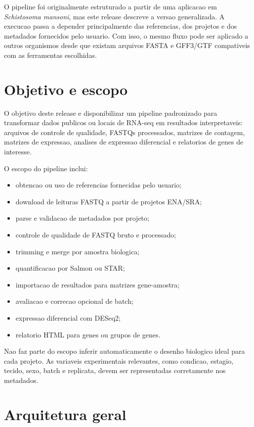 \documentclass[
  12pt,
  oneside,
  a4paper,
  chapter=TITLE,
  section=TITLE,
  brazil
]{abntex2}
\begin{document}
O pipeline foi originalmente estruturado a partir de uma aplicacao em \textit{Schistosoma mansoni}, mas este release descreve a versao generalizada. A execucao passa a depender principalmente das referencias, dos projetos e dos metadados fornecidos pelo usuario. Com isso, o mesmo fluxo pode ser aplicado a outros organismos desde que existam arquivos FASTA e GFF3/GTF compativeis com as ferramentas escolhidas.

\chapter{Objetivo e escopo}

O objetivo deste release e disponibilizar um pipeline padronizado para transformar dados publicos ou locais de RNA-seq em resultados interpretaveis: arquivos de controle de qualidade, FASTQs processados, matrizes de contagem, matrizes de expressao, analises de expressao diferencial e relatorios de genes de interesse.

O escopo do pipeline inclui:

\begin{itemize}[noitemsep]
  \item obtencao ou uso de referencias fornecidas pelo usuario;
  \item download de leituras FASTQ a partir de projetos ENA/SRA;
  \item parse e validacao de metadados por projeto;
  \item controle de qualidade de FASTQ bruto e processado;
  \item trimming e merge por amostra biologica;
  \item quantificacao por Salmon ou STAR;
  \item importacao de resultados para matrizes gene-amostra;
  \item avaliacao e correcao opcional de batch;
  \item expressao diferencial com DESeq2;
  \item relatorio HTML para genes ou grupos de genes.
\end{itemize}

Nao faz parte do escopo inferir automaticamente o desenho biologico ideal para cada projeto. As variaveis experimentais relevantes, como condicao, estagio, tecido, sexo, batch e replicata, devem ser representadas corretamente nos metadados.

\chapter{Arquitetura geral}
\end{document}
